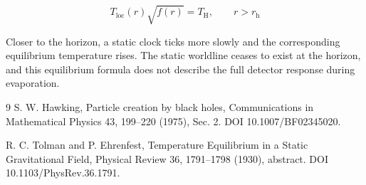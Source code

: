 \documentclass[11pt]{article}
\begin{document}
\begin{equation}
T_{\mathrm{loc}}(r)\sqrt{f(r)}=T_{\mathrm{H}},\qquad r>r_{\mathrm{h}}\label{eq:redshift}
\end{equation}

Closer to the horizon, a static clock ticks more slowly and the corresponding equilibrium temperature rises. The static worldline ceases to exist at the horizon, and this equilibrium formula does not describe the full detector response during evaporation.

\begin{thebibliography}{9}
 S. W. Hawking, Particle creation by black holes, Communications in Mathematical Physics 43, 199–220 (1975), Sec. 2. DOI 10.1007/BF02345020.

 R. C. Tolman and P. Ehrenfest, Temperature Equilibrium in a Static Gravitational Field, Physical Review 36, 1791–1798 (1930), abstract. DOI 10.1103/PhysRev.36.1791.

\end{thebibliography}
\end{document}
